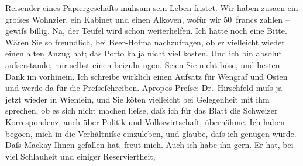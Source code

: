 \begin{ledgroupsized}[t]{13cm}
                    Reisender eines Papiergeschäfts mühsam sein Leben fristet. Wir haben zusa{\geminationm}en ein groſses Wohnzi{\geminationm}er, ein Kabinet und einen Alkoven, wofür wir 50 francs zahlen – gewiſs billig.
                    Na, der Teufel wird schon weiterhelfen.\pend
           \pstart
           Ich hätte noch eine Bitte. Wären Sie so freundlich, bei Beer-Hofma{\geminationn} nachzufragen, ob er vielleicht wieder einen {\pb}alten Anzug hat; das Porto ka{\geminationn} ja nicht viel kosten. Und ich bin absolut
                    auſserstande, mir selbst einen beizubringen. Seien Sie nicht böse, und besten
                    Dank im vorhinein.\pend
           \pstart
           Ich schreibe wirklich einen Aufsatz für Wengraf und Osten und werde da{\geminationn}{ }\label{K_L00499_1v}\label{K_L00499_1h} für die Preſseſchreiben. Apropos Preſse: Dr. Hirschfeld muſs ja
                    jetzt wieder in Wienſein, und Sie kö{\geminationn}ten vielleicht bei Gelegenheit mit ihm sprechen, ob es sich nicht machen
                    lieſse, daſs ich für das Blatt die Schweizer
                    Korrespondenz, auch über Politik und Volkswirtschaft, übernähme. Ich haben
                        bego{\geminationn}en, mich in die Verhältniſse einzuleben,
                    und glaube, daſs ich genügen würde.\pend
           \pstart
           Daſs Mackay Ihnen gefallen hat, freut mich.
                    Auch ich habe ihn gern. Er hat, bei viel Schlauheit und einiger Reserviertheit,

\end{ledgroupsized}
